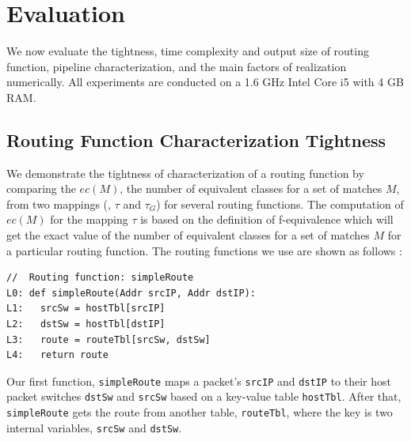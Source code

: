 \section{Evaluation}\label{sec:evaluation}

We now evaluate the tightness, time complexity and output size of routing function, pipeline characterization, and the main factors of realization numerically. All experiments are conducted on a 1.6 GHz Intel Core i5 with 4 GB RAM.


\subsection{Routing Function Characterization Tightness}
\label{sec:eval1}

We demonstrate the tightness of characterization of a routing function by comparing the $ec(M)$, the number of equivalent classes for a set of matches $M$, from two mappings (\ie, $\tau$ and $\tau_G$) for several routing functions. The computation of $ec(M)$ for the mapping $\tau$ is based on the definition of f-equivalence which will get the exact value of the number of equivalent classes for a set of matches $M$ for a particular routing function. The routing functions we use are shown as follows :

{\small
\begin{verbatim}
//  Routing function: simpleRoute
L0: def simpleRoute(Addr srcIP, Addr dstIP):
L1:   srcSw = hostTbl[srcIP]
L2:   dstSw = hostTbl[dstIP]
L3:   route = routeTbl[srcSw, dstSw]
L4:   return route
\end{verbatim}
}

Our first function, \texttt{simpleRoute} maps a packet's \texttt{srcIP} and \texttt{dstIP} to their host packet switches \texttt{dstSw} and \texttt{srcSw} based on a key-value table \texttt{hostTbl}. After that, \texttt{simpleRoute} gets the route from another table, \texttt{routeTbl}, where the key is two internal variables, \texttt{srcSw} and \texttt{dstSw}.


